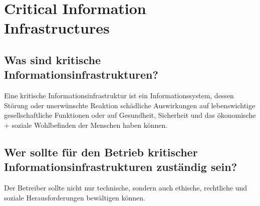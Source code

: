 \documentclass{article}
\begin{document}
\section{Critical Information Infrastructures}
\subsection{Was sind kritische Informationsinfrastrukturen?}
Eine kritische Informationsinfrastruktur ist ein Informationssystem, dessen Störung oder unerwünschte Reaktion schädliche Auswirkungen auf lebenswichtige gesellschaftliche Funktionen oder auf Gesundheit, Sicherheit und das ökonomische + soziale Wohlbefinden der Menschen haben können.
\subsection{Wer sollte für den Betrieb kritischer Informationsinfrastrukturen zuständig sein?}
Der Betreiber sollte nicht nur technische, sondern auch ethische, rechtliche und soziale Herausforderungen bewältigen können.
\end{document}
